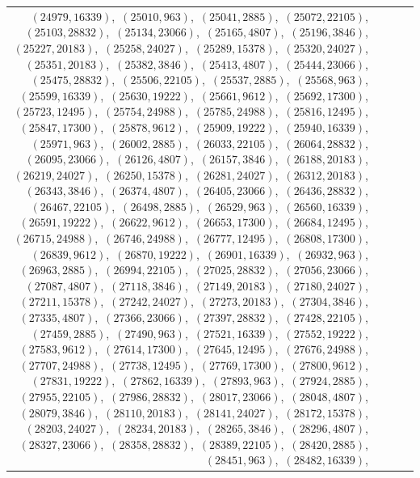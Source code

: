 \documentclass[11pt]{article}
\begin{document}
\begin{longtable}{@{}rrl>{\raggedright\arraybackslash}p{}@{}}
$(24979,16339)$,\allowbreak\ $(25010,963)$,\allowbreak\ $(25041,2885)$,\allowbreak\ $(25072,22105)$,\allowbreak\ $(25103,28832)$,\allowbreak\ $(25134,23066)$,\allowbreak\ $(25165,4807)$,\allowbreak\ $(25196,3846)$,\allowbreak\ $(25227,20183)$,\allowbreak\ $(25258,24027)$,\allowbreak\ $(25289,15378)$,\allowbreak\ $(25320,24027)$,\allowbreak\ $(25351,20183)$,\allowbreak\ $(25382,3846)$,\allowbreak\ $(25413,4807)$,\allowbreak\ $(25444,23066)$,\allowbreak\ $(25475,28832)$,\allowbreak\ $(25506,22105)$,\allowbreak\ $(25537,2885)$,\allowbreak\ $(25568,963)$,\allowbreak\ $(25599,16339)$,\allowbreak\ $(25630,19222)$,\allowbreak\ $(25661,9612)$,\allowbreak\ $(25692,17300)$,\allowbreak\ $(25723,12495)$,\allowbreak\ $(25754,24988)$,\allowbreak\ $(25785,24988)$,\allowbreak\ $(25816,12495)$,\allowbreak\ $(25847,17300)$,\allowbreak\ $(25878,9612)$,\allowbreak\ $(25909,19222)$,\allowbreak\ $(25940,16339)$,\allowbreak\ $(25971,963)$,\allowbreak\ $(26002,2885)$,\allowbreak\ $(26033,22105)$,\allowbreak\ $(26064,28832)$,\allowbreak\ $(26095,23066)$,\allowbreak\ $(26126,4807)$,\allowbreak\ $(26157,3846)$,\allowbreak\ $(26188,20183)$,\allowbreak\ $(26219,24027)$,\allowbreak\ $(26250,15378)$,\allowbreak\ $(26281,24027)$,\allowbreak\ $(26312,20183)$,\allowbreak\ $(26343,3846)$,\allowbreak\ $(26374,4807)$,\allowbreak\ $(26405,23066)$,\allowbreak\ $(26436,28832)$,\allowbreak\ $(26467,22105)$,\allowbreak\ $(26498,2885)$,\allowbreak\ $(26529,963)$,\allowbreak\ $(26560,16339)$,\allowbreak\ $(26591,19222)$,\allowbreak\ $(26622,9612)$,\allowbreak\ $(26653,17300)$,\allowbreak\ $(26684,12495)$,\allowbreak\ $(26715,24988)$,\allowbreak\ $(26746,24988)$,\allowbreak\ $(26777,12495)$,\allowbreak\ $(26808,17300)$,\allowbreak\ $(26839,9612)$,\allowbreak\ $(26870,19222)$,\allowbreak\ $(26901,16339)$,\allowbreak\ $(26932,963)$,\allowbreak\ $(26963,2885)$,\allowbreak\ $(26994,22105)$,\allowbreak\ $(27025,28832)$,\allowbreak\ $(27056,23066)$,\allowbreak\ $(27087,4807)$,\allowbreak\ $(27118,3846)$,\allowbreak\ $(27149,20183)$,\allowbreak\ $(27180,24027)$,\allowbreak\ $(27211,15378)$,\allowbreak\ $(27242,24027)$,\allowbreak\ $(27273,20183)$,\allowbreak\ $(27304,3846)$,\allowbreak\ $(27335,4807)$,\allowbreak\ $(27366,23066)$,\allowbreak\ $(27397,28832)$,\allowbreak\ $(27428,22105)$,\allowbreak\ $(27459,2885)$,\allowbreak\ $(27490,963)$,\allowbreak\ $(27521,16339)$,\allowbreak\ $(27552,19222)$,\allowbreak\ $(27583,9612)$,\allowbreak\ $(27614,17300)$,\allowbreak\ $(27645,12495)$,\allowbreak\ $(27676,24988)$,\allowbreak\ $(27707,24988)$,\allowbreak\ $(27738,12495)$,\allowbreak\ $(27769,17300)$,\allowbreak\ $(27800,9612)$,\allowbreak\ $(27831,19222)$,\allowbreak\ $(27862,16339)$,\allowbreak\ $(27893,963)$,\allowbreak\ $(27924,2885)$,\allowbreak\ $(27955,22105)$,\allowbreak\ $(27986,28832)$,\allowbreak\ $(28017,23066)$,\allowbreak\ $(28048,4807)$,\allowbreak\ $(28079,3846)$,\allowbreak\ $(28110,20183)$,\allowbreak\ $(28141,24027)$,\allowbreak\ $(28172,15378)$,\allowbreak\ $(28203,24027)$,\allowbreak\ $(28234,20183)$,\allowbreak\ $(28265,3846)$,\allowbreak\ $(28296,4807)$,\allowbreak\ $(28327,23066)$,\allowbreak\ $(28358,28832)$,\allowbreak\ $(28389,22105)$,\allowbreak\ $(28420,2885)$,\allowbreak\ $(28451,963)$,\allowbreak\ $(28482,16339)$,\allowbreak\ 
\end{longtable}
\end{document}

